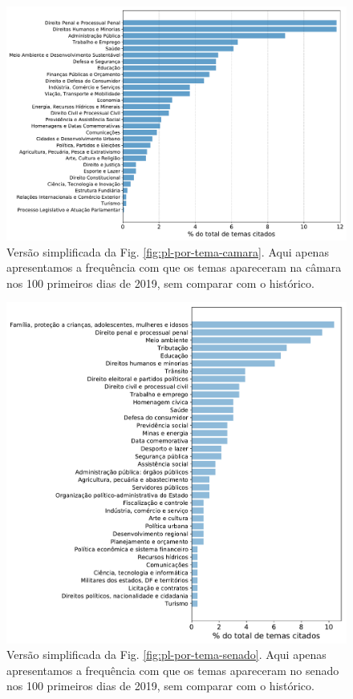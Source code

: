 \documentclass[12pt,a4paper]{article}
\begin{document}
\begin{figure}[H]
\centering
\includegraphics[width=1.0\textwidth]{graficos/temas_PL_fracao2019_2019-05-03.pdf}
\caption{Versão simplificada da Fig. \ref{fig:pl-por-tema-camara}. Aqui apenas apresentamos a frequência com
  que os temas apareceram na câmara nos 100 primeiros dias de 2019, sem comparar com o histórico.}
\label{fig:pl-por-tema-camara-simples}
\end{figure}

\begin{figure}[H]
\centering
\includegraphics[width=1.0\textwidth]{graficos/senado/pls-temas-senado-r-simples.pdf}
\caption{Versão simplificada da Fig. \ref{fig:pl-por-tema-senado}. Aqui apenas apresentamos a frequência com
  que os temas apareceram no senado nos 100 primeiros dias de 2019, sem comparar com o histórico.}
\label{fig:pl-por-tema-senado-simples}
\end{figure}
\end{document}
